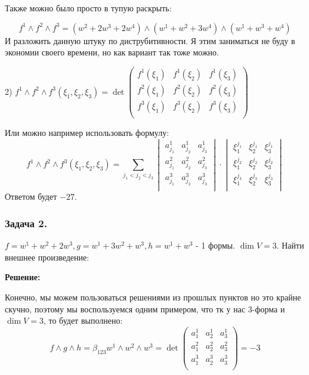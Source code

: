 Также можно было просто в тупую раскрыть: 

$$f^1\wedge f^2 \wedge f^3 = (w^2 + 2w^3 + 2w^4) \wedge  (w^1 + w^2 + 3w^4) \wedge (w^1 + w^3 + w^4)$$
И разложить данную штуку по диструбитивности. Я этим заниматься не буду в экономии своего времени, но как вариант так тоже можно.

2) $f^1 \wedge f^2 \wedge f^3 (\xi_1,\xi_2,\xi_3) = \det \begin{pmatrix}
    f^1(\xi_1) & f^1(\xi_2) & f^1(\xi_3)\\
    f^2(\xi_1) & f^2(\xi_2) & f^2(\xi_3)\\
    f^3(\xi_1) & f^3(\xi_2) & f^3(\xi_3)\\
\end{pmatrix}$


Или можно например использовать формулу:
$$ f^1 \wedge f^2 \wedge f^3 (\xi_1,\xi_2,\xi_3) = \sum\limits_{j_1<j_2<j_3}\begin{vmatrix}
    a^1_{j_1} & a^1_{j_2} & a^1_{j_3}\\
    a_{j_1}^2 & a^2_{j_2} & a^2_{j_3}\\
     a^3_{j_1} & a^3_{j_2} & a^3_{j_3}\\
\end{vmatrix} \cdot \begin{vmatrix}
    \xi_1^{j_1} & \xi_2^{j_1} & \xi_3^{j_1}\\
     \xi_1^{j_2} & \xi_2^{j_2} & \xi_3^{j_2}\\
      \xi_1^{j_3} & \xi_2^{j_3} & \xi_3^{j_3}\\
\end{vmatrix}$$
Ответом будет $-27$.
\subsubsection{Задача 2.}

$f = w^1 +w^2 + 2w^3, g = w^1+3w^2 + w^3, h= w^1 + w^3$ - 1 формы. $\dim V =3 $. Найти внешнее произведение:

\textbf{Решение:}

Конечно, мы можем пользоваться решениями из прошлых пунктов но это крайне скучно, поэтому мы воспользуемся одним примером, что тк у нас 3-форма и $\dim V = 3$, то будет выполнено: 
$$f\wedge g \wedge h = \beta_{123} w^1\wedge w^2 \wedge w^3  = \det \begin{pmatrix}
    a^1_{1} & a^1_{2} & a^1_{3}\\
    a_{1}^2 & a^2_{2} & a^2_{3}\\
     a^3_{1} & a^3_{2} & a^3_{3}\\
\end{pmatrix} = -3$$
